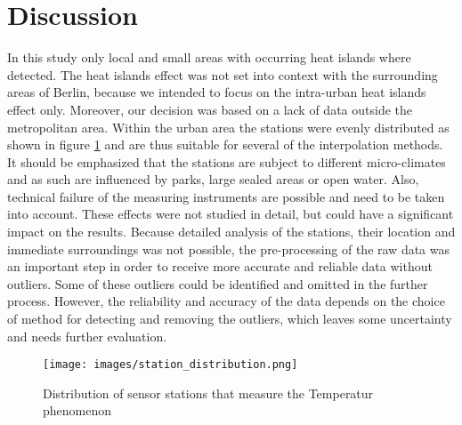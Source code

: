
\section{Discussion}
\label{sec:discussion}

In this study only local and small areas with occurring heat islands where detected. The \ldq{}heat islands effect\rdq{} was not set into context with the surrounding areas of Berlin, because we intended to focus on the intra-urban heat islands effect only. Moreover, our decision was based on a lack of data outside the metropolitan area. Within the urban area the stations were evenly distributed as shown in figure \ref{fig:station_dsitribution} and are thus suitable for several of the interpolation methods. It should be emphasized that the stations are subject to different micro-climates and as such are influenced by parks, large sealed areas or open water. \cite{chowienczyk_estimating_2020} Also, technical failure of the measuring instruments are possible and need to be taken into account. These effects were not studied in detail, but could have a significant impact on the results. Because detailed analysis of the stations, their location and immediate surroundings was not possible, the pre-processing of the raw data was an important step in order to receive more accurate and reliable data without outliers. Some of these outliers could be identified and omitted in the further process. However, the reliability and accuracy of the data depends on the choice of method for detecting and removing the outliers, which leaves some uncertainty and needs further evaluation. 

\begin{figure}[H]
	\centering
	\texttt{[image: images/station\_distribution.png]}
	\caption{Distribution of sensor stations that measure the \ldq{}Temperatur\rdq{} phenomenon}
	\label{fig:station_dsitribution}
\end{figure}

